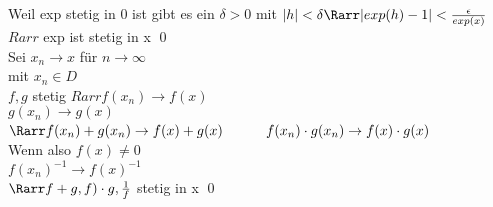 Weil exp stetig in 0 ist gibt es ein $\delta > 0$ mit $|h| < \delta \Rarr |exp(h) -1| < \frac{\epsilon}{exp(x)}$\\
$Rarr$ exp ist stetig in x \qed\\
%
%
Sei $x_n \to x$ für $n \to \infty$\\
mit $x_n \in D$\\
$f, g$ stetig $Rarr f(x_n) \to f(x)$ \\
\phantom{$f, g$ stetig $Rarr$} $g(x_n) \to g(x)$\\
$\Rarr f(x_n) + g(x_n) \to f(x) + g(x)$
$\phantom{\Rarr} f(x_n) \cdot g(x_n) \to f(x) \cdot g(x)$\\
Wenn also $f(x) \neq 0$\\
$f(x_n)^{-1} \to f(x)^{-1}$\\
$\Rarr f + g, f) \cdot g, \frac{1}{f}$ stetig in x \qed